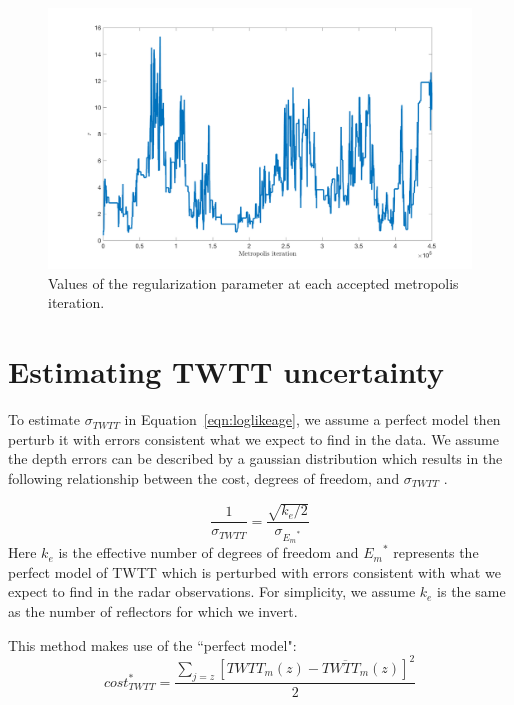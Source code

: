\begin{figure}[ht]
\centering
\includegraphics[scale=0.4]{../analysis/figures/regularization}
\caption[]{Values of the regularization parameter at each accepted metropolis iteration.}
\label{fig:reg}
\end{figure}








\section{Estimating TWTT uncertainty}\label{sec:sigmatwtt}
To estimate $\sigma_{TWTT}$ in Equation~\ref{eqn:loglikeage}, we assume a perfect model then perturb it with errors consistent what we expect to find in the data. We assume the depth errors can be described by a gaussian distribution which results in the following relationship between the cost, degrees of freedom, and $\sigma_{TWTT}$ \citep{jackson&huerta2016}.


\begin{equation}
\frac{1}{\sigma_{TWTT}}= \frac{\sqrt{k_e/2}}{\sigma_{{E_m}^*}}\tag{S2}
\end{equation}
Here $k_e$ is the effective number of degrees of freedom and ${E_m}^*$ represents the perfect model of TWTT which is perturbed with errors consistent with what we expect to find in the radar observations. For simplicity, we assume $k_e$ is the same as the number of reflectors for which we invert.

This method makes use of the ``perfect model":
\begin{equation}
cost^*_{TWTT} = \frac{\sum_{j = z}[TWTT_m(z) - \overline{TWTT_m}(z)]^2}{2}
\end{equation}


